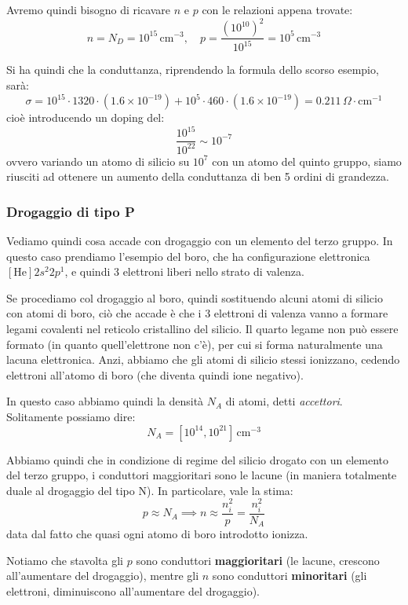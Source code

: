 \documentclass[a4paper,11pt]{article}
\begin{document}
Avremo quindi bisogno di ricavare $n$ e $p$ con le relazioni appena trovate:
$$
n = N_D = 10^{15} \, \mathrm{cm}^{-3}, \quad p = \frac{(10^{10})^2}{10^{15}} = 10^5 \, \mathrm{cm}^{-3}
$$

Si ha quindi che la conduttanza, riprendendo la formula dello scorso esempio, sarà:
$$
\sigma = 10^{15} \cdot 1320 \cdot (1.6 \times 10^{-19}) + 10^{5} \cdot 460 \cdot (1.6 \times 10^{-19}) = 0.211 \, \Omega \cdot \mathrm{cm}^{-1}
$$
cioè introducendo un doping del:
$$
\frac{10^{15}}{10^{22}} \sim 10^{-7}
$$
ovvero variando un atomo di silicio su $10^{7}$ con un atomo del quinto gruppo, siamo riusciti ad ottenere un aumento della conduttanza di ben 5 ordini di grandezza.

\subsubsection{Drogaggio di tipo P}
Vediamo quindi cosa accade con drogaggio con un elemento del terzo gruppo. In questo caso prendiamo l'esempio del boro, che ha configurazione elettronica $[\mathrm{He}] 2s^2 2p^1$, e quindi 3 elettroni liberi nello strato di valenza. 

Se procediamo col drogaggio al boro, quindi sostituendo alcuni atomi di silicio con atomi di boro, ciò che accade è che i 3 elettroni di valenza vanno a formare legami covalenti nel reticolo cristallino del silicio. Il quarto legame non può essere formato (in quanto quell'elettrone non c'è), per cui si forma naturalmente una lacuna elettronica. Anzi, abbiamo che gli atomi di silicio stessi ionizzano, cedendo elettroni all'atomo di boro (che diventa quindi ione negativo).

In questo caso abbiamo quindi la densità $N_A$ di atomi, detti \textit{accettori}. Solitamente possiamo dire:
$$
N_A = [10^{14}, 10^{21}] \, \mathrm{cm}^{-3}
$$

Abbiamo quindi che in condizione di regime del silicio drogato con un elemento del terzo gruppo, i conduttori maggioritari sono le lacune (in maniera totalmente duale al drogaggio del tipo N). In particolare, vale la stima:
$$
p \approx N_A \implies n \approx \frac{n_i^2}{p} = \frac{n_i^2}{N_A}
$$
data dal fatto che quasi ogni atomo di boro introdotto ionizza.

Notiamo che stavolta gli $p$ sono conduttori \textbf{maggioritari} (le lacune, crescono all'aumentare del drogaggio), mentre gli $n$ sono conduttori \textbf{minoritari} (gli elettroni, diminuiscono all'aumentare del drogaggio).
\end{document}
